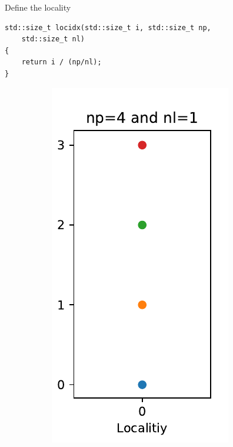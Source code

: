 \documentclass[12pt,t]{beamer}
\begin{document}
\begin{frame}[fragile]{Define the locality}

\begin{lstlisting}
std::size_t locidx(std::size_t i, std::size_t np, 
	std::size_t nl)
{
    return i / (np/nl);
}
\end{lstlisting}
\vspace{-0.75cm}
\begin{figure}
    \centering
    \begin{subfigure}[b]{0.3\textwidth}
        \includegraphics[width=\textwidth]{./images/partition2}

\end{subfigure}
\end{figure}
\end{frame}
\end{document}
